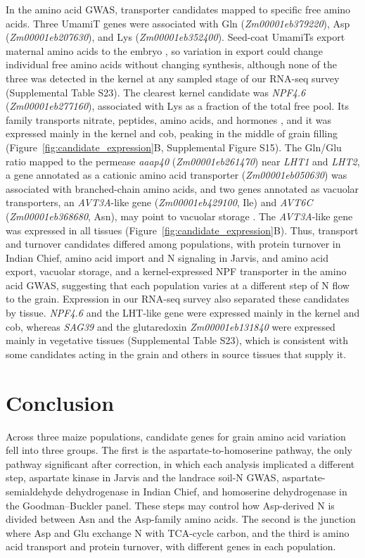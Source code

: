 \documentclass[namedate,unnumsec,webpdf,contemporary,large]{oup-authoring-template}
\begin{document}
In the amino acid GWAS, transporter candidates mapped to specific free amino acids. Three UmamiT genes were associated with Gln (\textit{Zm00001eb379220}), Asp (\textit{Zm00001eb207630}), and Lys (\textit{Zm00001eb352400}). Seed-coat UmamiTs export maternal amino acids to the embryo \citep{Muller2015UmamiT}, so variation in export could change individual free amino acids without changing synthesis, although none of the three was detected in the kernel at any sampled stage of our RNA-seq survey (Supplemental Table S23). The clearest kernel candidate was \textit{NPF4.6} (\textit{Zm00001eb277160}), associated with Lys as a fraction of the total free pool. Its family transports nitrate, peptides, amino acids, and hormones \citep{Leran2014NPF}, and it was expressed mainly in the kernel and cob, peaking in the middle of grain filling (Figure~\ref{fig:candidate_expression}B, Supplemental Figure S15). The Gln/Glu ratio mapped to the permease \textit{aaap40} (\textit{Zm00001eb261470}) near \textit{LHT1} and \textit{LHT2}, a gene annotated as a cationic amino acid transporter (\textit{Zm00001eb050630}) was associated with branched-chain amino acids, and two genes annotated as vacuolar transporters, an \textit{AVT3A}-like gene (\textit{Zm00001eb429100}, Ile) and \textit{AVT6C} (\textit{Zm00001eb368680}, Asn), may point to vacuolar storage \citep{Fujiki2017AtAVT3}. The \textit{AVT3A}-like gene was expressed in all tissues (Figure~\ref{fig:candidate_expression}B). Thus, transport and turnover candidates differed among populations, with protein turnover in Indian Chief, amino acid import and N signaling in Jarvis, and amino acid export, vacuolar storage, and a kernel-expressed NPF transporter in the amino acid GWAS, suggesting that each population varies at a different step of N flow to the grain. Expression in our RNA-seq survey also separated these candidates by tissue. \textit{NPF4.6} and the LHT-like gene were expressed mainly in the kernel and cob, whereas \textit{SAG39} and the glutaredoxin \textit{Zm00001eb131840} were expressed mainly in vegetative tissues (Supplemental Table S23), which is consistent with some candidates acting in the grain and others in source tissues that supply it.

\section{Conclusion}

Across three maize populations, candidate genes for grain amino acid variation fell into three groups. The first is the aspartate-to-homoserine pathway, the only pathway significant after correction, in which each analysis implicated a different step, aspartate kinase in Jarvis and the landrace soil-N GWAS, aspartate-semialdehyde dehydrogenase in Indian Chief, and homoserine dehydrogenase in the Goodman--Buckler panel. These steps may control how Asp-derived N is divided between Asn and the Asp-family amino acids. The second is the junction where Asp and Glu exchange N with TCA-cycle carbon, and the third is amino acid transport and protein turnover, with different genes in each population.
\end{document}
